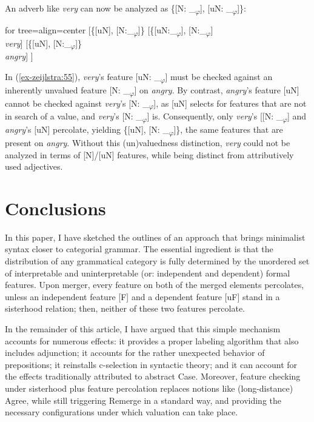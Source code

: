 \documentclass[output=paper
,modfonts
,nonflat]{langsci/langscibook}
\begin{document}
\noindent An adverb like \textit{very} can now be analyzed as \{[N: \_\textsubscript{$\varphi$}], [uN: \_\textsubscript{$\varphi$}]\}: 

\begin{exe}
\ex \label{ex-zeijlstra:55}
	\begin{forest}	for tree={align=center}
	[\{{[}uN{]}{,} {[}N:\_\textsubscript{$\varphi$}{]}\}
	[\{{[}uN:\_\textsubscript{$\varphi$}{]}{,} {[}N:\_\textsubscript{$\varphi$}{]}\\ \textit{very}]
	[\{{[}uN{]}{,} {[}N:\_\textsubscript{$\varphi$}{]}\}\\ \textit{angry}] 
	]
	\end{forest}
\end{exe} 

\noindent In (\ref{ex-zeijlstra:55}), \textit{very}’s feature [uN: \_\textsubscript{$\varphi$}] must be checked against an inherently unvalued feature [N: \_\textsubscript{$\varphi$}] on \textit{angry}. By contrast, \textit{angry}’s feature [uN] cannot be checked against \textit{very}’s [N: \_\textsubscript{$\varphi$}], as [uN] selects for features that are not in search of a value, and \textit{very}’s [N: \_\textsubscript{$\varphi$}] is. Consequently, only \textit{very}’s [[N: \_\textsubscript{$\varphi$}] and \textit{angry}’s [uN] percolate, yielding \{[uN], [N: \_\textsubscript{$\varphi$}]\}, the same features that are present on \textit{angry}. Without this (un)valuedness distinction, \textit{very} could not be analyzed in terms of [N]/[uN] features, while being distinct from attributively used adjectives.

\section{Conclusions}
In this paper, I have sketched the outlines of an approach that brings minimalist syntax closer to categorial grammar. The essential ingredient is that the distribution of any grammatical category is fully determined by the unordered set of interpretable and uninterpretable (or: independent and dependent) formal features. Upon merger, every feature on both of the merged elements percolates, unless an independent feature {[}F{]} and a dependent feature {[}uF{]} stand in a sisterhood relation; then, neither of these two features percolate.

In the remainder of this article, I have argued that this simple mechanism accounts for numerous effects: it provides a proper labeling algorithm that also includes adjunction; it accounts for the rather unexpected behavior of prepositions; it reinstalls c-selection in syntactic theory; and it can account for the effects traditionally attributed to abstract Case. Moreover, feature checking under sisterhood plus feature percolation replaces notions like (long-distance) Agree, while still triggering Remerge in a standard way, and providing the necessary configurations under which valuation can take place.
\end{document}
